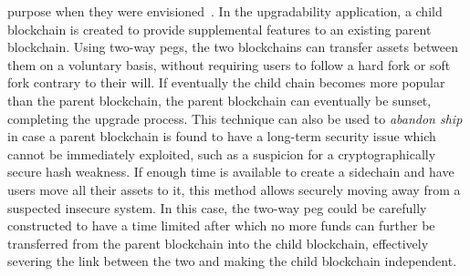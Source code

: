 purpose when they were envisioned~\cite{sidechains}. In the upgradability
application, a child blockchain is created to provide supplemental features to
an existing parent blockchain. Using two-way pegs, the two blockchains can
transfer assets between them on a voluntary basis, without requiring users to
follow a hard fork or soft fork contrary to their will. If eventually the child
chain becomes more popular than the parent blockchain, the parent blockchain can
eventually be sunset, completing the upgrade process. This technique can also be
used to \emph{abandon ship} in case a parent blockchain is found to have a
long-term security issue which cannot be immediately exploited, such as a
suspicion for a cryptographically secure hash weakness. If enough time is
available to create a sidechain and have users move all their assets to it, this
method allows securely moving away from a suspected insecure system. In this
case, the two-way peg could be carefully constructed to have a time limited
after which no more funds can further be transferred from the parent blockchain
into the child blockchain, effectively severing the link between the two and
making the child blockchain independent.

